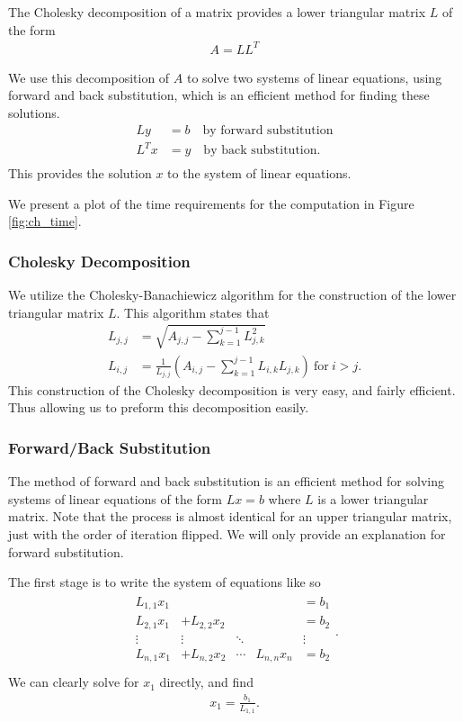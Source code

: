 \documentclass[../fem.tex]{subfile}
\begin{document}
The Cholesky decomposition of a matrix provides a lower triangular matrix $L$
of the form
\begin{align*}
   A=LL^T
\end{align*}

We use this decomposition of $A$ to solve two systems of linear equations,
using forward and back substitution, which is an efficient method for finding
these solutions.
\begin{align*}
  Ly&=b\quad\text{by forward substitution}\\
  L^Tx&=y\quad\text{by back substitution}.\\
\end{align*}
This provides the solution $x$ to the system of linear equations.

We present a plot of the time requirements for the computation in
Figure \ref{fig:ch_time}.

\subsubsection{Cholesky Decomposition}%
\label{ssub:cholesky_decomposition}


We utilize the Cholesky-Banachiewicz algorithm for the construction of the
lower triangular matrix $L$. This algorithm states that
\begin{align*}
  L_{j,j}&=\sqrt{A_{j,j}-\sum_{k=1}^{j-1}L_{j,k}^2}\\
  L_{i,j}&=\frac{1}{L_{j,j}}\left(A_{i,j}-\sum_{k=1}^{j-1}L_{i,k}L_{j,k}\right)\
  \text{for}\ i>j.
\end{align*}
This construction of the Cholesky decomposition is very easy, and fairly
efficient. Thus allowing us to preform this decomposition easily.

\subsubsection{Forward/Back Substitution}%
\label{ssub:forward_back_substitution}

The method of forward and back substitution is an efficient method for solving
systems of linear equations of the form $Lx=b$ where $L$ is a lower triangular
matrix. Note that the process is almost identical for an upper triangular
matrix, just with the order of iteration flipped. We will only provide an
explanation for forward substitution.

The first stage is to write the system of equations like so
\begin{align*}
  \begin{matrix}
    L_{1,1}x_1 & & & & =b_1\\
    L_{2,1}x_1 & +L_{2,2}x_2 & & & =b_2\\
    \vdots & \vdots & \ddots & & \vdots\\
    L_{n,1}x_1 & +L_{n,2}x_2 & \cdots & L_{n,n}x_n & =b_2\\
  \end{matrix}.
\end{align*}
We can clearly solve for $x_1$ directly, and find
\begin{align*}
  x_1=\frac{b_1}{L_{1,1}}.
\end{align*}
\end{document}
